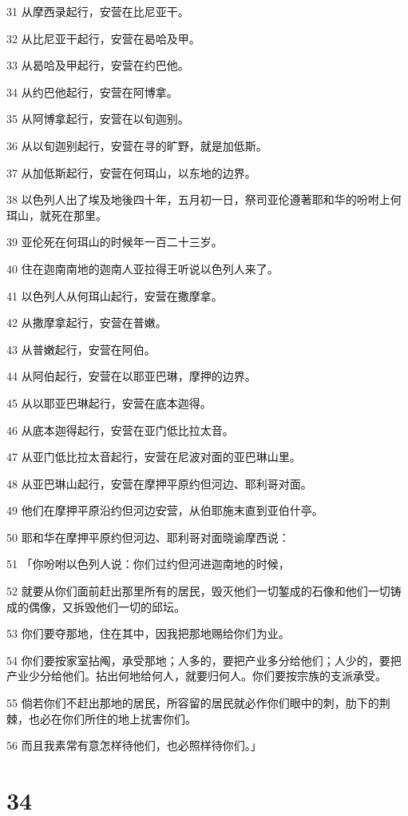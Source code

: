 \par 31 从摩西录起行，安营在比尼亚干。
\par 32 从比尼亚干起行，安营在曷哈及甲。
\par 33 从曷哈及甲起行，安营在约巴他。
\par 34 从约巴他起行，安营在阿博拿。
\par 35 从阿博拿起行，安营在以旬迦别。
\par 36 从以旬迦别起行，安营在寻的旷野，就是加低斯。
\par 37 从加低斯起行，安营在何珥山，以东地的边界。
\par 38 以色列人出了埃及地後四十年，五月初一日，祭司亚伦遵著耶和华的吩咐上何珥山，就死在那里。
\par 39 亚伦死在何珥山的时候年一百二十三岁。
\par 40 住在迦南南地的迦南人亚拉得王听说以色列人来了。
\par 41 以色列人从何珥山起行，安营在撒摩拿。
\par 42 从撒摩拿起行，安营在普嫩。
\par 43 从普嫩起行，安营在阿伯。
\par 44 从阿伯起行，安营在以耶亚巴琳，摩押的边界。
\par 45 从以耶亚巴琳起行，安营在底本迦得。
\par 46 从底本迦得起行，安营在亚门低比拉太音。
\par 47 从亚门低比拉太音起行，安营在尼波对面的亚巴琳山里。
\par 48 从亚巴琳山起行，安营在摩押平原约但河边、耶利哥对面。
\par 49 他们在摩押平原沿约但河边安营，从伯耶施末直到亚伯什亭。
\par 50 耶和华在摩押平原约但河边、耶利哥对面晓谕摩西说：
\par 51 「你吩咐以色列人说：你们过约但河进迦南地的时候，
\par 52 就要从你们面前赶出那里所有的居民，毁灭他们一切錾成的石像和他们一切铸成的偶像，又拆毁他们一切的邱坛。
\par 53 你们要夺那地，住在其中，因我把那地赐给你们为业。
\par 54 你们要按家室拈阄，承受那地；人多的，要把产业多分给他们；人少的，要把产业少分给他们。拈出何地给何人，就要归何人。你们要按宗族的支派承受。
\par 55 倘若你们不赶出那地的居民，所容留的居民就必作你们眼中的刺，肋下的荆棘，也必在你们所住的地上扰害你们。
\par 56 而且我素常有意怎样待他们，也必照样待你们。」

\chapter{34}

